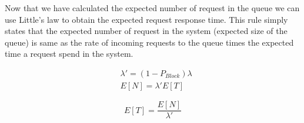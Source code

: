 \documentclass{article}
\begin{document}
Now that we have calculated the expected number of request in the queue we can
use Little's law to obtain the expected request response time.  This rule
simply states that the expected number of request in the system (expected size
of the queue) is same as the rate of incoming requests to the queue times the
expected time a request spend in the system.

\begin{align*}
	&\lambda' = (1 - P_{Block}) \lambda \\
	&E[N] = \lambda' E[T]
\end{align*}

\begin{equation}
	E[T] = \frac{E[N]}{\lambda'}
\end{equation}
\end{document}
